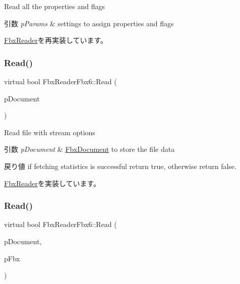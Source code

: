 Read all the properties and flags 
\begin{DoxyParams}{引数}
{\em p\+Params} & settings to assign properties and flags \\
\hline
\end{DoxyParams}


\hyperlink{class_fbx_reader_aa026634b699bea0df1b43850c08bb63a}{Fbx\+Reader}を再実装しています。

\mbox{\label{class_fbx_reader_fbx6_ab16aeaede33ca635a0493069aac4fbea}} 
\subsubsection{\texorpdfstring{Read()}{Read()}\hspace{0.1cm}{\footnotesize\ttfamily [1/2]}}
{\footnotesize\ttfamily virtual bool Fbx\+Reader\+Fbx6\+::\+Read (\begin{DoxyParamCaption}\item[{\hyperlink{class_fbx_document}{Fbx\+Document} $\ast$}]{p\+Document }\end{DoxyParamCaption})\hspace{0.3cm}{\ttfamily [virtual]}}

Read file with stream options 
\begin{DoxyParams}{引数}
{\em p\+Document} & \hyperlink{class_fbx_document}{Fbx\+Document} to store the file data \\
\hline
\end{DoxyParams}
\begin{DoxyReturn}{戻り値}
if fetching statistics is successful return {\ttfamily true}, otherwise return {\ttfamily false}. 
\end{DoxyReturn}


\hyperlink{class_fbx_reader_a29941746acc73d7ffd2411a9be9d2525}{Fbx\+Reader}を実装しています。

\mbox{\label{class_fbx_reader_fbx6_aaf4d83d83558463da215d522cb1c4503}} 
\subsubsection{\texorpdfstring{Read()}{Read()}\hspace{0.1cm}{\footnotesize\ttfamily [2/2]}}
{\footnotesize\ttfamily virtual bool Fbx\+Reader\+Fbx6\+::\+Read (\begin{DoxyParamCaption}\item[{\hyperlink{class_fbx_document}{Fbx\+Document} $\ast$}]{p\+Document,  }\item[{\hyperlink{class_fbx_i_o}{Fbx\+IO} $\ast$}]{p\+Fbx }\end{DoxyParamCaption})\hspace{0.3cm}{\ttfamily [virtual]}}

